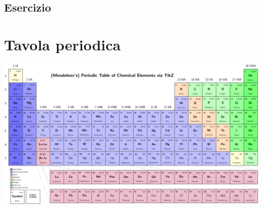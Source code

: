 \section{Esercizio}

\chapter{Tavola periodica}\label{chp:Tavolaperiodica}
\newpage
\includegraphics[scale = 1, angle = 90]{gfx/Periodic_table2017}